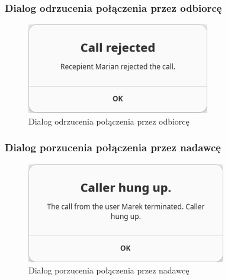 \subsubsection{Dialog odrzucenia połączenia przez odbiorcę}

\begin{figure}[H]
	\centering
	\includegraphics[width=.6\textwidth]{img/gui/screen_recepient_reject}
	\caption{Dialog odrzucenia połączenia przez odbiorcę}
\end{figure}

\subsubsection{Dialog porzucenia połączenia przez nadawcę}

\begin{figure}[H]
	\centering
	\includegraphics[width=.6\textwidth]{img/gui/screen_caller_hungup}
	\caption{Dialog porzucenia połączenia przez nadawcę}
\end{figure}
